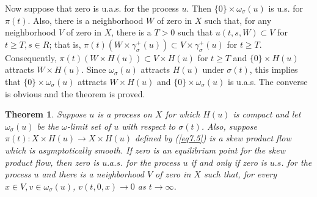 \documentclass{surv-l}
\theoremstyle{plain}
\newtheorem{theorem}{Theorem}[section]
\theoremstyle{definition}
\numberwithin{equation}{section}
\numberwithin{figure}{chapter}
\begin{document}
Now suppose that zero is u.a.s. for the process $u$. Then $\{0\}\times\omega_{\sigma}(u)$ is u.s. for $\pi(t)$. Also, there is a neighborhood $W$ of zero in $X$ such that, for any neighborhood $V$ of zero in $X$, there is a $T>0$ such that $u(t, s, W)\subset V$ for $t \geq T,s \in R$; that is, $\pi(t)(W\times\gamma_{\sigma}^{+}(u))\subset V\times\gamma_{\sigma}^{+}(u)$ for $t\geq T$. Consequently, $\pi(t)(W\times H(u))\subset V\times H(u)$ for $t\geq T$ and $\{0\}\times H(u)$ attracts $W\times H(u)$. Since $\omega_{\sigma}(u)$ attracts $H(u)$ under $\sigma(t)$, this implies that $\{0\}\times\omega_{\sigma}(u)$ attracts $W\times H(u)$ and $\{0\}\times\omega_{\sigma}(u)$ is u.a.s. The converse is obvious and the theorem is proved.
\begin{theorem}\label{thm3.7.4} Suppose $u$ is a process on $X$ for which $H(u)$ is compact and let $\omega_{\sigma}(u)$ be the $\omega$-limit set of $u$ with respect to $\sigma(t)$. Also, suppose $\pi(t)\!:X\times H(u)\rightarrow X\times H(u)$ defined by \emph{(\ref{eq7.5})} is a skew product flow which is asymptotically smooth. If zero is an equilibrium point for the skew product flow, then zero is $u.a.s$. for the process $u$ if and only if zero is $u.s$. for the process $u$ and there is a neighborhood $V$ of zero in $X$ such that, for every $x\in V,v\in\omega_{\sigma}(u)$, $v(t,0,x)\rightarrow 0$ as $ t\rightarrow\infty$.
\end{theorem}
\end{document}
